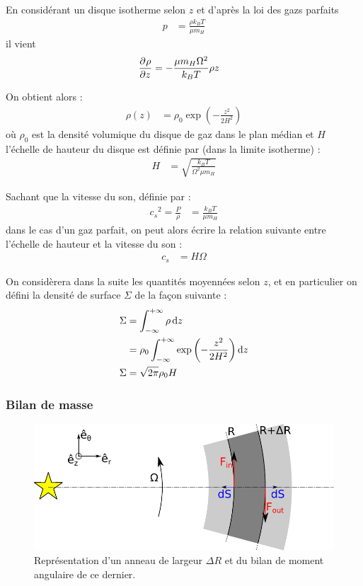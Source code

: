 En considérant un disque isotherme selon $z$ et d'après la loi des gazs parfaits
\begin{align}
p &= \frac{\rho k_B T}{\mu m_H}
\end{align}
il vient
\begin{align}
\mathinner{ \dfrac{\partial{^{}}\rho}{\partial{{z}^{}}} } &= -\frac{\mu m_H\Omega^2}{k_B T}\rho z
\end{align}

On obtient alors :
\begin{align}
\rho(z) &= \rho_0\exp\left(-\frac{z^2}{2H^2}\right)
\end{align}
où $\rho_0$ est la densité volumique du disque de gaz dans le plan médian et $H$ l'échelle de hauteur du disque est définie par (dans la limite isotherme) : 
\begin{align}
H &= \sqrt{\frac{k_B T}{\Omega^2 \mu m_H}}
\end{align}

\bigskip

Sachant que la vitesse du son, définie par :
\begin{align}
{c_s}^2=\frac{P}{\rho} &= \frac{k_B T}{\mu m_H}
\end{align}
dans le cas d'un gaz parfait, on peut alors écrire la relation suivante entre l'échelle de hauteur et la vitesse du son : 
\begin{align}
c_s &= H\Omega
\end{align}

\bigskip

On considèrera dans la suite les quantités moyennées selon $z$, et en particulier on défini la densité de surface $\Sigma$ de la façon suivante : 
\begin{align}
\Sigma &= \int_{-\infty}^{+\infty} \rho \dif z\nonumber\\
&=\rho_0 \int_{-\infty}^{+\infty}  \exp\left(-\frac{z^2}{2H^2}\right)\dif z\nonumber\\
\Sigma &= \sqrt{2\pi}\rho_0 H\label{eq:surface-to-volume}
\end{align}


\subsubsection{Bilan de masse}
\begin{figure}[htbp]
\centering
\includegraphics[width=0.7\linewidth]{figure/disk_ring.pdf}
\caption{Représentation d'un anneau de largeur $\Delta R$ et du bilan de moment angulaire de ce dernier.}\label{fig:disk_ring}
\end{figure}

